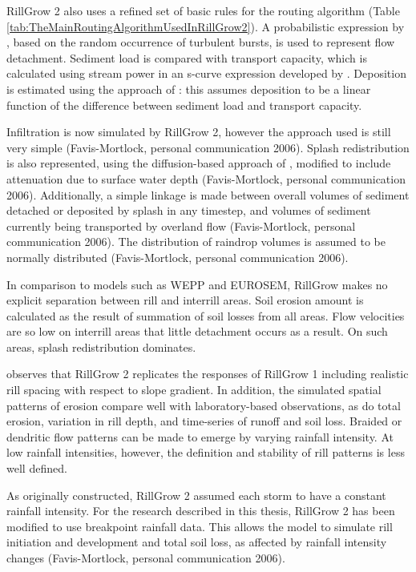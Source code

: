 RillGrow 2 also uses a refined set of basic rules for the routing algorithm
(Table \ref{tab:TheMainRoutingAlgorithmUsedInRillGrow2}). A probabilistic
expression by \citet{nearing1991-81}, based on the random occurrence of
turbulent bursts, is used to represent flow detachment. Sediment load is
compared with transport capacity, which is calculated using stream power in an
s-curve expression developed by \citet{nearing1997-865}. Deposition is estimated
using the approach of  \citet{lei1998-3157}: this assumes deposition to be a
linear function of the difference between sediment load and transport capacity.

Infiltration is now simulated by RillGrow 2, however the approach used is still
very simple (Favis-Mortlock, personal communication 2006). Splash redistribution
is also represented, using the diffusion-based approach of
\citet{planchon2000-131}, modified to include attenuation due to surface water
depth (Favis-Mortlock, personal communication 2006). Additionally, a simple
linkage is made between overall volumes of sediment detached or deposited by
splash in any timestep, and volumes of sediment currently being transported by
overland flow (Favis-Mortlock, personal communication 2006). The distribution of
raindrop volumes is assumed to be normally distributed (Favis-Mortlock, personal
communication 2006).

In comparison to models such as WEPP and EUROSEM, RillGrow makes no explicit
separation between rill and interrill areas. Soil erosion amount is calculated
as the result of summation of soil losses from all areas.
Flow velocities are so low on interrill areas that little detachment occurs as a
result. On such areas, splash redistribution dominates.

\citet{favis-mortlock2000-2173} observes that RillGrow 2 replicates the
responses of RillGrow 1 including realistic rill spacing with respect to slope
gradient. In addition, the simulated spatial patterns of erosion compare well
with laboratory-based observations, as do total erosion, variation in rill
depth, and time-series of runoff and soil loss. Braided or dendritic flow
patterns can be made to emerge by varying rainfall intensity. At low rainfall
intensities, however, the definition and stability of rill patterns is less well
defined.

As originally constructed, RillGrow 2 assumed each storm to have a constant
rainfall intensity. For the research described in this thesis, RillGrow 2 has
been modified to use breakpoint rainfall data. This allows the model to simulate
rill initiation and development and total soil loss, as affected by rainfall
intensity changes (Favis-Mortlock, personal communication 2006).

